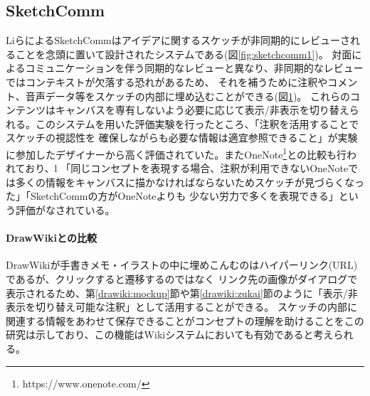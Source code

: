 \subsection{SketchComm}

\begin{figure}[H] \begin{minipage}{0.5\hsize}
                      \begin{center} 
                      \end{center} \caption{} \label{fig:sketchcomm1}
\end{minipage} \begin{minipage}{0.5\hsize}
                   \begin{center} 
                   \end{center} \caption{} \label{fig:sketchcomm2}
\end{minipage}
\end{figure}
LiらによるSketchComm\cite{Li2012SketchCommAT}はアイデアに関するスケッチが非同期的にレビューされることを念頭に置いて設計されたシステムである(図\ref{fig:sketchcomm1})。
対面によるコミュニケーションを伴う同期的なレビューと異なり、非同期的なレビューではコンテキストが欠落する恐れがあるため、
それを補うために注釈やコメント、音声データ等をスケッチの内部に埋め込むことができる(図\ref{fig:sketchcomm2})。
これらのコンテンツはキャンバスを専有しないよう必要に応じて表示/非表示を切り替えられる。このシステムを用いた評価実験を行ったところ、「注釈を活用することでスケッチの視認性を
確保しながらも必要な情報は適宜参照できること」が実験に参加したデザイナーから高く評価されていた。またOneNote\footnote{https://www.onenote.com/}との比較も行われており、l
「同じコンセプトを表現する場合、注釈が利用できないOneNoteでは多くの情報をキャンバスに描かなければならないためスケッチが見づらくなった」「SketchCommの方がOneNoteよりも
少ない労力で多くを表現できる」という評価がなされている。

\paragraph*{DrawWikiとの比較}
DrawWikiが手書きメモ・イラストの中に埋めこんむのはハイパーリンク(URL)であるが、クリックすると遷移するのではなく
リンク先の画像がダイアログで表示されるため、第\ref{drawiki:mockup}節や第\ref{drawiki:zukai}節のように「表示/非表示を切り替え可能な注釈」として活用することができる。
スケッチの内部に関連する情報をあわせて保存できることがコンセプトの理解を助けることをこの研究は示しており、この機能はWikiシステムにおいても有効であると考えられる。